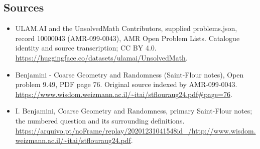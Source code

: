 \documentclass[11pt,a4paper]{article}
\begin{document}
\subsection{Sources}
\begin{itemize}
\item[S1] ULAM.AI and the UnsolvedMath Contributors, supplied problems.json, record 10000043 (AMR-099-0043), AMR Open Problem Lists. Catalogue identity and source transcription; CC BY 4.0.
\url{https://huggingface.co/datasets/ulamai/UnsolvedMath}.
\item[S2] Benjamini - Coarse Geometry and Randomness (Saint-Flour notes), Open problem 9.49, PDF page 76. Original source indexed by AMR-099-0043.
\url{https://www.wisdom.weizmann.ac.il/~itai/stflouraug24.pdf#page=76}.
\item[S3] I. Benjamini, Coarse Geometry and Randomness, primary Saint-Flour notes; the numbered question and its surrounding definitions.
\url{https://arquivo.pt/noFrame/replay/20201231041548id_/http://www.wisdom.weizmann.ac.il/~itai/stflouraug24.pdf}.
\end{itemize}
\end{document}
